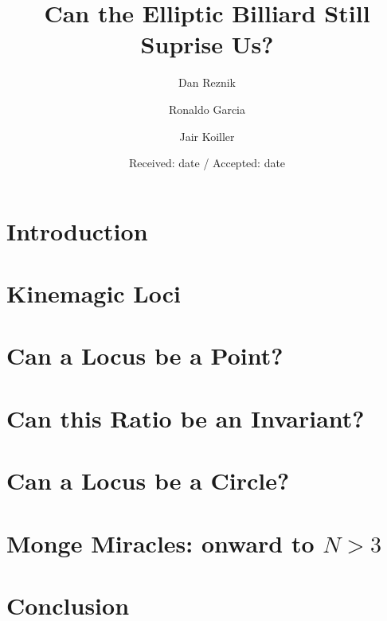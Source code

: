 \documentclass{svjour3}
\begin{document}
\title{Can the Elliptic Billiard Still Suprise Us?}

\author{Dan Reznik \and Ronaldo Garcia \and Jair Koiller}



\date{Received: date / Accepted: date}

\maketitle



\section{Introduction}
\label{intro}


\section{Kinemagic Loci}
\label{sec:loci}


\section{Can a Locus be a Point?}
\label{sec:mitten}


\section{Can this Ratio be an Invariant?}
\label{sec:cosines}


\section{Can a Locus be a Circle?}
\label{sec:circles}


\section{Monge Miracles: onward to $N>3$}
\label{sec:generalize}


\section{Conclusion}
\label{sec:conclusion}

\end{document}
